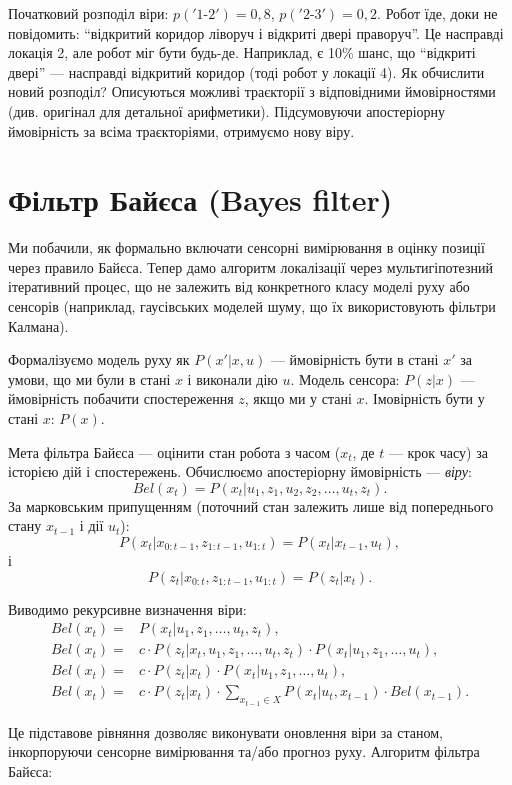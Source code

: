 Початковий розподіл віри: $p('1\text{-}2')=0{,}8$, $p('2\text{-}3')=0{,}2$. Робот їде, доки не повідомить: ``відкритий коридор ліворуч і відкриті двері праворуч''. Це насправді локація 2, але робот міг бути будь-де. Наприклад, є 10\% шанс, що ``відкриті двері'' — насправді відкритий коридор (тоді робот у локації 4). Як обчислити новий розподіл? Описуються можливі траєкторії з відповідними ймовірностями (див. оригінал для детальної арифметики). Підсумовуючи апостеріорну ймовірність за всіма траєкторіями, отримуємо нову віру.

\section{Фільтр Байєса (Bayes filter)}
Ми побачили, як формально включати сенсорні вимірювання в оцінку позиції через правило Байєса. Тепер дамо алгоритм локалізації через мультигіпотезний ітеративний процес, що не залежить від конкретного класу моделі руху або сенсорів (наприклад, гаусівських моделей шуму, що їх використовують фільтри Калмана).

Формалізуємо модель руху як $P(x'|x,u)$ — ймовірність бути в стані $x'$ за умови, що ми були в стані $x$ і виконали дію $u$. Модель сенсора: $P(z|x)$ — ймовірність побачити спостереження $z$, якщо ми у стані $x$. Імовірність бути у стані $x$: $P(x)$.

Мета фільтра Байєса — оцінити стан робота з часом ($x_t$, де $t$ — крок часу) за історією дій і спостережень. Обчислюємо апостеріорну ймовірність — \emph{віру}:
$$
Bel(x_t) = P(x_t|u_1,z_1,u_2,z_2,\dots,u_t,z_t).
$$
За марковським припущенням (поточний стан залежить лише від попереднього стану $x_{t-1}$ і дії $u_t$):
$$
P(x_t|x_{0:t-1}, z_{1:t-1}, u_{1:t}) = P(x_t|x_{t-1},u_t),
$$
і
$$
P(z_t|x_{0:t}, z_{1:t-1}, u_{1:t}) = P(z_t|x_t).
$$

Виводимо рекурсивне визначення віри:
\begin{align}
    Bel(x_t) ={}&  P(x_t|u_1,z_1,\dots,u_t,z_t),\\
    Bel(x_t) ={}& c \cdot P(z_t|x_t,u_1,z_1,\dots,u_t,z_t) \cdot P(x_t|u_1,z_1,\dots,u_t),\\
    Bel(x_t) ={}& c \cdot P(z_t|x_t) \cdot P(x_t|u_1,z_1,\dots,u_t),\\
    Bel(x_t) ={}& c \cdot P(z_t|x_t) \cdot  \sum_{x_{t-1}\in X}{P(x_t|u_t,x_{t-1}) \cdot Bel(x_{t-1})}.
\end{align}

Це підставове рівняння дозволяє виконувати оновлення віри за станом, інкорпоруючи сенсорне вимірювання та/або прогноз руху. Алгоритм фільтра Байєса:

